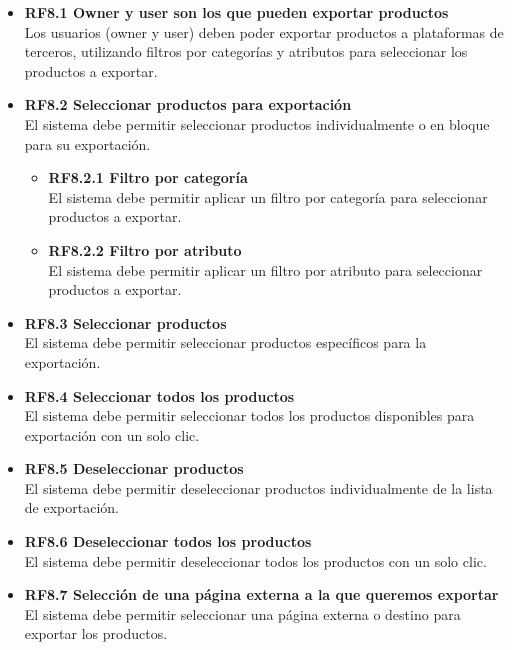 \documentclass[12pt.a4paper]{article}
\begin{document}
\begin{itemize}
    \item \textbf{RF8.1 Owner y user son los que pueden exportar productos} \\
    Los usuarios (owner y user) deben poder exportar productos a plataformas de terceros, utilizando filtros por categorías y atributos para seleccionar los productos a exportar.

    \item \textbf{RF8.2 Seleccionar productos para exportación} \\
    El sistema debe permitir seleccionar productos individualmente o en bloque para su exportación.
    \begin{itemize}
        \item \textbf{RF8.2.1 Filtro por categoría} \\
        El sistema debe permitir aplicar un filtro por categoría para seleccionar productos a exportar.

        \item \textbf{RF8.2.2 Filtro por atributo} \\
        El sistema debe permitir aplicar un filtro por atributo para seleccionar productos a exportar.
    \end{itemize}

    \item \textbf{RF8.3 Seleccionar productos} \\
    El sistema debe permitir seleccionar productos específicos para la exportación.

    \item \textbf{RF8.4 Seleccionar todos los productos} \\
    El sistema debe permitir seleccionar todos los productos disponibles para exportación con un solo clic.

    \item \textbf{RF8.5 Deseleccionar productos} \\
    El sistema debe permitir deseleccionar productos individualmente de la lista de exportación.

    \item \textbf{RF8.6 Deseleccionar todos los productos} \\
    El sistema debe permitir deseleccionar todos los productos con un solo clic.

    \item \textbf{RF8.7 Selección de una página externa a la que queremos exportar} \\
    El sistema debe permitir seleccionar una página externa o destino para exportar los productos.


\end{itemize}
\end{document}
